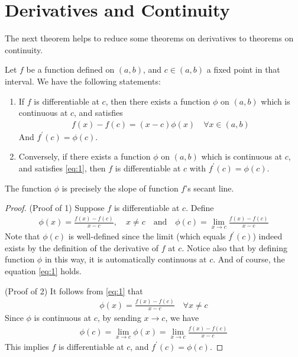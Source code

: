 \documentclass[thmcnt=section, 12pt]{my-elegantbook}
\begin{document}

\section{Derivatives and Continuity}

The next theorem helps to reduce some theorems on derivatives to theorems on continuity.

\begin{theorem} \label{thm:1}
    Let $f$ be a function defined on $(a, b)$, and $c \in (a, b)$ a fixed point in that interval. We have the following statements:
    \begin{enumerate}
        \item If $f$ is differentiable at $c$, then there exists a function $\phi$ on $(a, b)$ which is continuous at $c$, and satisfies
              \begin{align}
                  f(x) - f(c) = (x - c) \phi(x)
                  \quad \forall x \in (a, b)
                  \label{eq:1}
              \end{align}
              And $f^\prime(c) = \phi(c)$.
        \item Conversely, if there exists a function $\phi$ on $(a, b)$ which is continuous at $c$, and satisfies \eqref{eq:1}, then $f$ is differentiable at $c$ with $f^\prime(c) = \phi(c)$.
    \end{enumerate}
\end{theorem}

The function $\phi$ is precisely the slope of function $f$'s secant line.

\begin{proof}
    (Proof of 1) Suppose $f$ is differentiable at $c$. Define
    \begin{align*}
        \phi(x) = \frac{f(x) - f(c)}{x - c},
        \quad x \neq c
        \quad\text{and}\quad
        \phi(c) = \lim_{x \to c} \frac{f(x) - f(c)}{x - c}
    \end{align*}
    Note that $\phi(c)$ is well-defined since the limit (which equals $f^\prime(c)$) indeed exists by the definition of the derivative of $f$ at $c$. Notice also that by defining function $\phi$ in this way, it is automatically continuous at $c$. And of course, the equation \eqref{eq:1} holds.

    (Proof of 2) It follows from \eqref{eq:1} that
    \begin{align*}
        \phi(x) = \frac{f(x) - f(c)}{x - c}
        \quad \forall x \neq c
    \end{align*}
    Since $\phi$ is continuous at $c$, by sending $x \to c$, we have
    \begin{align*}
        \phi(c) = \lim_{x \to c} \phi(x)
        = \lim_{x \to c} \frac{f(x) - f(c)}{x - c}
    \end{align*}
    This implies $f$ is differentiable at $c$, and $f^\prime(c) = \phi(c)$.
\end{proof}
\end{document}
